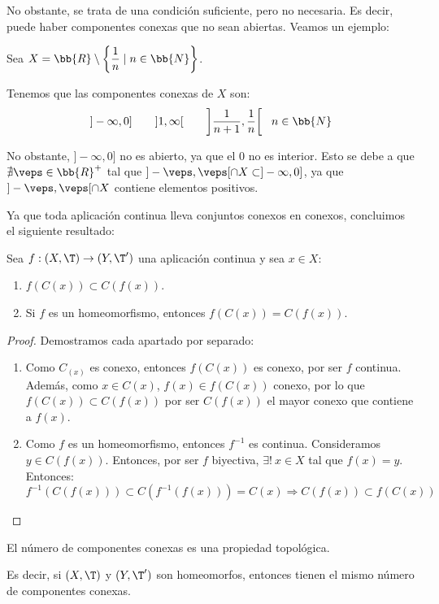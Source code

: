 No obstante, se trata de una condición suficiente, pero no necesaria. Es decir, puede haber componentes conexas que no sean abiertas. Veamos un ejemplo:
\begin{ejemplo}
    Sea $X=\bb{R}\setminus \left\{\dfrac{1}{n}\mid n\in \bb{N}\right\}$.

    Tenemos que las componentes conexas de $X$ son:
    \begin{equation*}
        ]-\infty, 0] \qquad ]1,\infty[ \qquad \left]\dfrac{1}{n+1}, \dfrac{1}{n}\right[~~n\in \bb{N}
    \end{equation*}
    
    No obstante, $]-\infty, 0]$ no es abierto, ya que el $0$ no es interior. Esto se debe a que
    $\nexists \veps\in \bb{R}^+$ tal que $]-\veps, \veps[\cap X \subset ]-\infty, 0]$, ya que $]-\veps, \veps[\cap X$ contiene elementos positivos.
\end{ejemplo}

Ya que toda aplicación continua lleva conjuntos conexos en conexos, concluimos el siguiente resultado:
\begin{prop}
    Sea $f:(X,\T)\to (Y,\T')$ una aplicación continua y sea $x\in X$:
    \begin{enumerate}
        \item $f(C(x))\subset C(f(x))$.
        \item Si $f$ es un homeomorfismo, entonces $f(C(x))=C(f(x))$.
    \end{enumerate}
\end{prop}
\begin{proof}
    Demostramos cada apartado por separado:
    \begin{enumerate}
        \item Como $C_(x)$ es conexo, entonces $f(C(x))$ es conexo, por ser $f$ continua.
        Además, como $x\in C(x)$, $f(x)\in f(C(x))$ conexo, por lo que $f(C(x))\subset C(f(x))$ por ser $C(f(x))$ el mayor conexo que contiene a $f(x)$.
        \item Como $f$ es un homeomorfismo, entonces $f^{-1}$ es continua. Consideramos $y\in C(f(x))$. Entonces, por ser $f$ biyectiva, $\exists!~x\in X$ tal que $f(x)=y$. Entonces:
        \begin{equation*}
            f^{-1}(C(f(x))) \subset C(f^{-1}(f(x))) = C(x) \Longrightarrow C(f(x)) \subset f(C(x))
        \end{equation*}
    \end{enumerate}
\end{proof}
\begin{coro}
    El número de componentes conexas es una propiedad topológica.

    Es decir, si $(X,\T)$ y $(Y,\T')$ son homeomorfos, entonces tienen el mismo número de componentes conexas.
\end{coro}



